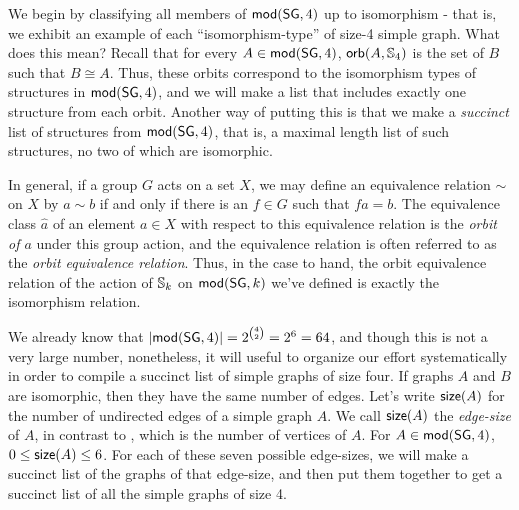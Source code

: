 We begin by classifying all members of $\mbox{$\mathsf{mod}(\mbox{$\mathsf{SG}$},4)$}$ up to isomorphism - that is, we exhibit an example of each ``isomorphism-type'' of size-4 simple graph. What does this mean? Recall that for every $A\in\mbox{$\mathsf{mod}(\mbox{$\mathsf{SG}$},4)$}$, $\mbox{$\mathsf{orb}(A,\mathbb{S}_4)$}$ is the set of $B$ such that $B\cong A$. Thus, these orbits correspond to the isomorphism types of structures in $\mbox{$\mathsf{mod}(\mbox{$\mathsf{SG}$},4)$}$, and we will make a list that includes exactly one structure from each orbit. Another way of putting this is that we make a \emph{succinct} list of structures from $\mbox{$\mathsf{mod}(\mbox{$\mathsf{SG}$},4)$}$, that is, a maximal length list of such structures, no two of which are isomorphic.
\begin{aside}
In general, if a group $G$ acts on a set $X$, we may define an equivalence relation $\sim$ on $X$ by $a\sim b$ if and only if there is an $f\in G$ such that $fa=b$. The equivalence class $\hat{a}$ of an element $a\in X$ with respect to this equivalence relation is the \emph{orbit of $a$} under this group action, and the equivalence relation is often referred to as the \emph{orbit equivalence relation}. Thus, in the case to hand, the orbit equivalence relation of the action of $\mbox{$\mathbb{S}_{k}$}$ on  $\mbox{$\mathsf{mod}(\mbox{$\mathsf{SG}$},k)$}$ we've defined is exactly the isomorphism relation.
\end{aside} 

We already know that $\mbox{$|$\mbox{$\mathsf{mod}(\mbox{$\mathsf{SG}$},4)$}$|$}= 2^{\binom{4}{2}}=2^6=64$, and though this is not a very large number, nonetheless, it will useful to organize our effort systematically in order to compile a succinct list of simple graphs of size four. If graphs $A$ and $B$ are isomorphic, then they have the same number of edges. Let's write $\mbox{$\mathsf{size}(A)$}$ for the number of undirected edges of a simple graph $A$. We call $\mbox{$\mathsf{size}(A)$}$ the \emph{edge-size} of $A$, in contrast to , which is the number of vertices of $A$. For $A\in \mbox{$\mathsf{mod}(\mbox{$\mathsf{SG}$},4)$}$, $0\leq \mbox{$\mathsf{size}(A)$}\leq 6$. For each of these seven possible edge-sizes, we will make a succinct list of the graphs of that edge-size, and then put them together to get a succinct list of all the simple graphs of size 4. 

